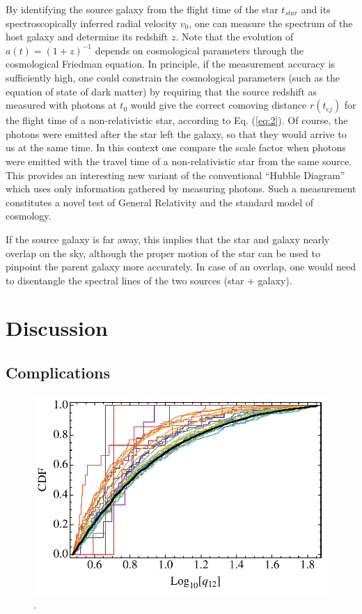\documentclass[a4paper,twocolumn]{emulateapj}
\begin{document}
By identifying the source galaxy from the flight time of the star
$t_{star}$ and its spectroscopically inferred radial velocity $v_0$,
one can measure the spectrum of the host galaxy and determine its
redshift $z$. Note that the evolution of $a(t)=(1+z)^{-1}$ depends on
cosmological parameters through the cosmological Friedman equation. In
principle, if the measurement accuracy is sufficiently high, one could
constrain the cosmological parameters (such as the equation of state
of dark matter) by requiring that the source redshift as measured with
photons at $t_0$ would give the correct comoving distance $r(t_{ej})$
for the flight time of a non-relativistic star, according to
Eq. (\ref{eq:2}). Of course, the photons were emitted after the star
left the galaxy, so that they would arrive to us at the same time. In
this context one compare the scale factor when photons were emitted
with the travel time of a non-relativistic star from the same
source. This provides an interesting new variant of the conventional
``Hubble Diagram'' which uses only information gathered by measuring
photons. Such a measurement constitutes a novel test of General
Relativity and the standard model of cosmology.

If the source galaxy is far away, this implies that the star and
galaxy nearly overlap on the sky, although the proper motion of the
star can be used to pinpoint the parent galaxy more accurately. In
case of an overlap, one would need to disentangle the spectral lines
of the two sources (star $+$ galaxy).

\section{Discussion}
\subsection{Complications}
\begin{figure}
\centering\includegraphics[width=\linewidth,clip=true]{qcdf}
\caption{.}
\label{fig:qcdf}
\end{figure}
\end{document}
